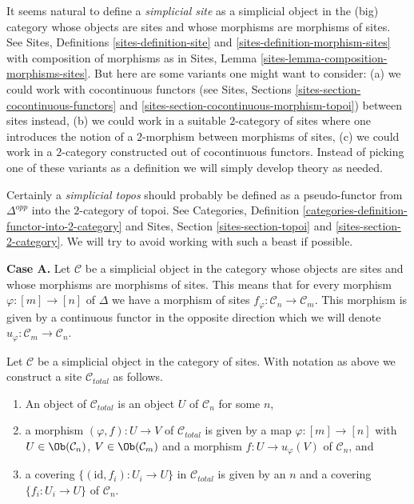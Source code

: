 \noindent
It seems natural to define a {\it simplicial site} as a simplicial
object in the (big) category whose objects are sites
and whose morphisms are morphisms of sites.
See Sites, Definitions \ref{sites-definition-site} and
\ref{sites-definition-morphism-sites}
with composition of morphisms as in 
Sites, Lemma \ref{sites-lemma-composition-morphisms-sites}.
But here are some variants one might want to consider:
(a) we could work with cocontinuous functors
(see Sites, Sections \ref{sites-section-cocontinuous-functors} and
\ref{sites-section-cocontinuous-morphism-topoi}) between sites instead,
(b) we could work in a suitable $2$-category of sites where one introduces
the notion of a $2$-morphism between morphisms of sites,
(c) we could work in a $2$-category constructed out of cocontinuous
functors. Instead of picking one of these variants as a definition
we will simply develop theory as needed.

\medskip\noindent
Certainly a {\it simplicial topos} should probably be defined as a
pseudo-functor from $\Delta^{opp}$ into the $2$-category of topoi.
See Categories, Definition \ref{categories-definition-functor-into-2-category}
and Sites, Section \ref{sites-section-topoi} and
\ref{sites-section-2-category}. We will try to avoid working with such
a beast if possible.

\medskip\noindent
{\bf Case A.}
Let $\mathcal{C}$ be a simplicial object in the category whose objects
are sites and whose morphisms are morphisms of sites. This means that
for every morphism $\varphi : [m] \to [n]$ of $\Delta$ we have a morphism
of sites $f_\varphi : \mathcal{C}_n \to \mathcal{C}_m$. This morphism is
given by a continuous functor in the opposite direction which we will denote
$u_\varphi : \mathcal{C}_m \to \mathcal{C}_n$.

\begin{lemma}
\label{lemma-simplicial-site-site}
Let $\mathcal{C}$ be a simplicial object in the category of sites.
With notation as above we construct a site $\mathcal{C}_{total}$ as follows.
\begin{enumerate}
\item An object of $\mathcal{C}_{total}$ is an object $U$ of
$\mathcal{C}_n$ for some $n$,
\item a morphism $(\varphi, f) : U \to V$ of $\mathcal{C}_{total}$
is given by a map $\varphi : [m] \to [n]$ with
$U \in \Ob(\mathcal{C}_n)$, $V \in \Ob(\mathcal{C}_m)$
and a morphism $f : U \to u_\varphi(V)$ of $\mathcal{C}_n$, and
\item a covering $\{(\text{id}, f_i) :  U_i \to U\}$ in $\mathcal{C}_{total}$
is given by an $n$ and a covering $\{f_i : U_i \to U\}$
of $\mathcal{C}_n$.
\end{enumerate}
\end{lemma}

